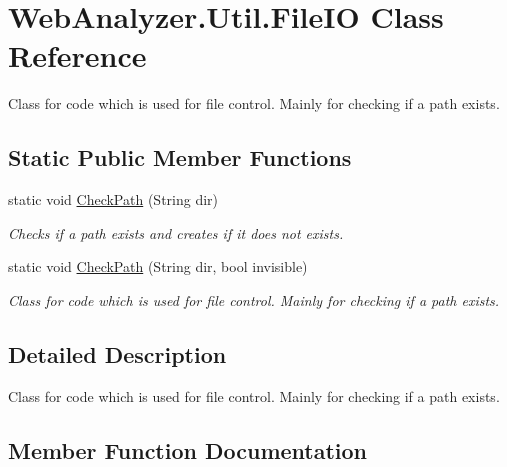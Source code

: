 \hypertarget{class_web_analyzer_1_1_util_1_1_file_i_o}{}\section{Web\+Analyzer.\+Util.\+File\+I\+O Class Reference}
\label{class_web_analyzer_1_1_util_1_1_file_i_o}


Class for code which is used for file control. Mainly for checking if a path exists.  


\subsection*{Static Public Member Functions}
\begin{DoxyCompactItemize}
\item 
static void \hyperlink{class_web_analyzer_1_1_util_1_1_file_i_o_ade732314697d3b6c286da9723fd53672}{Check\+Path} (String dir)
\begin{DoxyCompactList}\small\item\em Checks if a path exists and creates if it does not exists. \end{DoxyCompactList}\item 
static void \hyperlink{class_web_analyzer_1_1_util_1_1_file_i_o_a818d487a79ee8e7dd2b5f76f4e9e71bd}{Check\+Path} (String dir, bool invisible)
\begin{DoxyCompactList}\small\item\em Class for code which is used for file control. Mainly for checking if a path exists. \end{DoxyCompactList}\end{DoxyCompactItemize}


\subsection{Detailed Description}
Class for code which is used for file control. Mainly for checking if a path exists. 



\subsection{Member Function Documentation}
\hypertarget{class_web_analyzer_1_1_util_1_1_file_i_o_ade732314697d3b6c286da9723fd53672}{}
